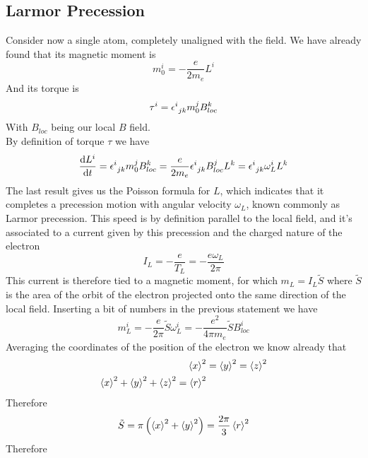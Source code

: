 \documentclass[../electromagnetism.tex]{subfiles}
\begin{document}
\subsection{Larmor Precession}
Consider now a single atom, completely unaligned with the field. We have already found that its magnetic moment is
\begin{equation*}
	m^i_0=-\frac{e}{2m_e}L^i
\end{equation*}
And its torque is
\begin{equation*}
	\tau^i=\epsilon^{i}_{\ jk}m^j_0B^k_{loc}
\end{equation*}
With $B_{loc}$ being our local $B$ field.\\
By definition of torque $\tau$ we have
\begin{equation}
	\dv{L^i}{t}=\epsilon^{i}_{\ jk}m^j_0B^k_{loc}=\frac{e}{2m_e}\epsilon^{i}_{\ jk}B_{loc}^jL^k=\epsilon^{i}_{\ jk}\omega^i_{L}L^k
	\label{eq:larmorprec}
\end{equation}
The last result gives us the Poisson formula for $L$, which indicates that it completes a precession motion with angular velocity $\omega_L$, known commonly as Larmor precession. This speed is by definition parallel to the local field, and it's associated to a current given by this precession and the charged nature of the electron
\begin{equation}
	I_L=-\frac{e}{T_L}=-\frac{e\omega_L}{2\pi}
	\label{eq:larmorcurrent}
\end{equation}
This current is therefore tied to a magnetic moment, for which $m_L=I_L\tilde{S}$ where $\tilde{S}$ is the area of the orbit of the electron projected onto the same direction of the local field. Inserting a bit of numbers in the previous statement we have
\begin{equation*}
	m_L^i=-\frac{e}{2\pi}\tilde{S}\omega_L^i=-\frac{e^2}{4\pi m_e}\tilde{S}B^i_{loc}
\end{equation*}
Averaging the coordinates of the position of the electron we know already that
\begin{equation*}
	\begin{aligned}
		\expval{x}^2&=\expval{y}^2=\expval{z}^2\\
		\expval{x}^2+\expval{y}^2+\expval{z}^2=\expval{r}^2
	\end{aligned}
\end{equation*}
Therefore
\begin{equation*}
	\tilde{S}=\pi\left( \expval{x}^2+\expval{y}^2 \right)=\frac{2\pi}{3}\expval{r}^2
\end{equation*}
Therefore
\end{document}
